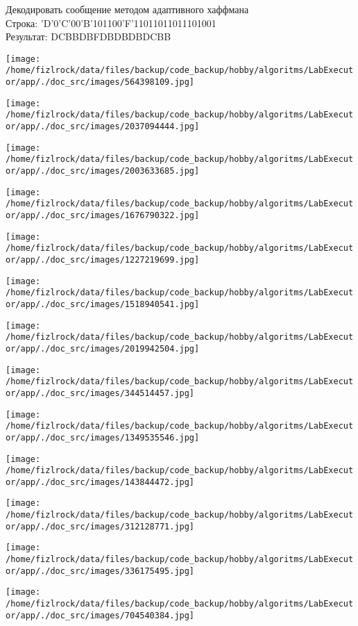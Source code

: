 \documentclass[a4paper, 12pt]{article}
\begin{document}
Декодировать сообщение методом адаптивного хаффмана \\
Строка: 
'D'0'C'00'B'101100'F'11011011011101001\\
Результат: DCBBDBFDBDBDBDCBB

\texttt{[image: /home/fizlrock/data/files/backup/code\_backup/hobby/algoritms/LabExecutor/app/./doc\_src/images/564398109.jpg]}

\texttt{[image: /home/fizlrock/data/files/backup/code\_backup/hobby/algoritms/LabExecutor/app/./doc\_src/images/2037094444.jpg]}

\texttt{[image: /home/fizlrock/data/files/backup/code\_backup/hobby/algoritms/LabExecutor/app/./doc\_src/images/2003633685.jpg]}

\texttt{[image: /home/fizlrock/data/files/backup/code\_backup/hobby/algoritms/LabExecutor/app/./doc\_src/images/1676790322.jpg]}

\texttt{[image: /home/fizlrock/data/files/backup/code\_backup/hobby/algoritms/LabExecutor/app/./doc\_src/images/1227219699.jpg]}

\texttt{[image: /home/fizlrock/data/files/backup/code\_backup/hobby/algoritms/LabExecutor/app/./doc\_src/images/1518940541.jpg]}

\texttt{[image: /home/fizlrock/data/files/backup/code\_backup/hobby/algoritms/LabExecutor/app/./doc\_src/images/2019942504.jpg]}

\texttt{[image: /home/fizlrock/data/files/backup/code\_backup/hobby/algoritms/LabExecutor/app/./doc\_src/images/344514457.jpg]}

\texttt{[image: /home/fizlrock/data/files/backup/code\_backup/hobby/algoritms/LabExecutor/app/./doc\_src/images/1349535546.jpg]}

\texttt{[image: /home/fizlrock/data/files/backup/code\_backup/hobby/algoritms/LabExecutor/app/./doc\_src/images/143844472.jpg]}

\texttt{[image: /home/fizlrock/data/files/backup/code\_backup/hobby/algoritms/LabExecutor/app/./doc\_src/images/312128771.jpg]}

\texttt{[image: /home/fizlrock/data/files/backup/code\_backup/hobby/algoritms/LabExecutor/app/./doc\_src/images/336175495.jpg]}

\texttt{[image: /home/fizlrock/data/files/backup/code\_backup/hobby/algoritms/LabExecutor/app/./doc\_src/images/704540384.jpg]}
\end{document}
